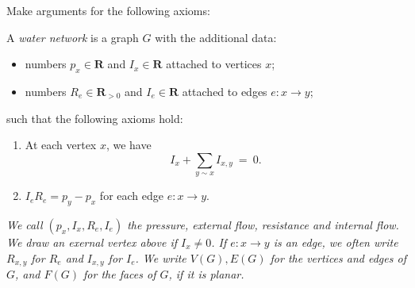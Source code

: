 \documentclass[11pt,fleqn]{book} %
\begin{document}
\begin{problem} 
    Make arguments for the following axioms:
   \begin{axiom}
    A \textit{water network} is a graph $G$ with the additional data: 
    \begin{itemize}
     \item  numbers $p_x\in \mathbf{R}$ and $I_x\in \mathbf{R}$ attached to vertices $x$;
     \item  numbers $R_{e}\in \mathbf{R}_{>0}$ and $I_{e}\in \mathbf{R}$ attached to edges $e:x\to y$;
    \end{itemize}
    such that the following axioms hold:
    \begin{enumerate}[label =\alph*.]
        \item At each vertex $x$, we have 
        $$I_x + \sum_{y\sim x}I_{x,y} \ = \ 0.$$
        \item $I_e R_e= p_y - p_x$ for each edge $e:x\to y$.
    \end{enumerate}
   \end{axiom}

\end{problem}


\textit{We call $(p_x,I_x,R_{e},I_{e})$ the \textit{pressure, external flow, resistance and internal flow}. We draw an exernal vertex above if $I_x \ne 0$. If $e:x\to y$ is an edge, we often write $R_{x,y}$ for $R_e$ and $I_{x,y}$ for $I_e$. We write $V(G),E(G)$ for the vertices and edges of $G$, and $F(G)$ for the faces of $G$, if it is planar.}
\end{document}
